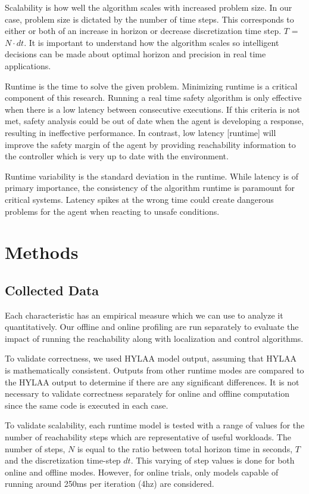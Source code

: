 \documentclass[runningheads]{llncs}
\begin{document}
Scalability is how well the algorithm scales with increased problem size. In our case, problem size is dictated by the number of time steps. This corresponds to either or both of an increase in horizon or decrease discretization time step. $T$ = $N\cdot dt$. It is important to understand how the algorithm scales so intelligent decisions can be made about optimal horizon and precision in real time applications.

Runtime is the time to solve the given problem. Minimizing runtime is a critical component of this research. Running a real time safety algorithm is only effective when there is a low latency between consecutive executions. If this criteria is not met, safety analysis could be out of date when the agent is developing a response, resulting in ineffective performance. In contrast, low latency [runtime] will improve the safety margin of the agent by providing reachability information to the controller which is very up to date with the environment.

Runtime variability is the standard deviation in the runtime. While latency is of primary importance, the consistency of the algorithm runtime is paramount for critical systems. Latency spikes at the wrong time could create dangerous problems for the agent when reacting to unsafe conditions. 

\section{Methods}
\subsection{Collected Data}
Each characteristic has an empirical measure which we can use to analyze it quantitatively. Our offline and online profiling are run separately to evaluate the impact of running the reachability along with localization and control algorithms.

To validate correctness, we used HYLAA model output, assuming that HYLAA is mathematically consistent. Outputs from other runtime modes are compared to the HYLAA output to determine if there are any significant differences. It is not necessary to validate correctness separately for online and offline computation since the same code is executed in each case.

To validate scalability, each runtime model is tested with a range of values for the number of reachability steps which are representative of useful workloads. The number of steps, $N$ is equal to the ratio between total horizon time in seconds, $T$ and the discretization time-step $dt$. This varying of step values is done for both online and offline modes. However, for online trials, only models capable of running around 250ms per iteration (4hz) are considered.
\end{document}
